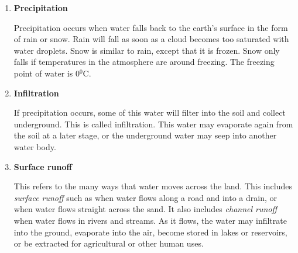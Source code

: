 \begin{enumerate}
\item{\textbf{Precipitation}

Precipitation occurs when water falls back to the earth's surface in the form of rain or snow. Rain will fall as soon as a cloud becomes too saturated with water droplets. Snow is similar to rain, except that it is frozen. Snow only falls if temperatures in the atmosphere are around freezing. The freezing point of water is 0$^{0}$C.}

\item{\textbf{Infiltration} 

If precipitation occurs, some of this water will filter into the soil and collect underground. This is called infiltration. This water may evaporate again from the soil at a later stage, or the underground water may seep into another water body.}

\item{\textbf{Surface runoff}

This refers to the many ways that water moves across the land. This includes \textit{surface runoff} such as when water flows along a road and into a drain, or when water flows straight across the sand. It also includes \textit{channel runoff} when water flows in rivers and streams. As it flows, the water may infiltrate into the ground, evaporate into the air, become stored in lakes or reservoirs, or be extracted for agricultural or other human uses. 
}
\end{enumerate}





